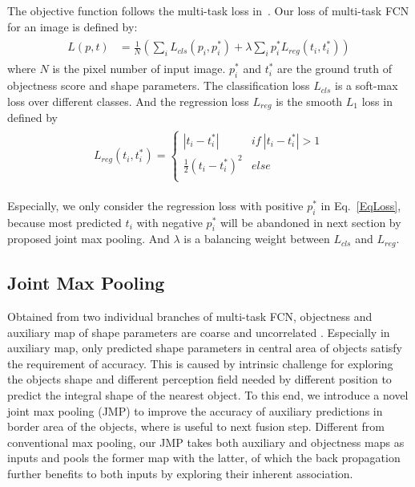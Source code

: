 The objective function follows the multi-task loss in~\cite{Ren2015}.
Our loss of multi-task FCN for an image is defined by:
\begin{eqnarray}\label{EqLoss}
\begin{aligned}
L(p,t) &= \frac{1}{N}(\sum_{i}L_{cls}(p_i,p^*_{i})+\lambda\sum_{i}p^*_{i}L_{reg}(t_{i},t^*_{i}))
\end{aligned}
\end{eqnarray}
where $N$ is the pixel number of input image.
$p^*_i$ and $t^*_i$ are the ground truth of objectness score and shape parameters.
The classification loss $L_{cls}$ is a soft-max loss over different classes.
And the regression loss $L_{reg}$ is the smooth $L_1$ loss in \cite{Ren2015} defined by
\begin{eqnarray}
\label{EqSmoothL1}
\begin{aligned}
L_{reg}(t_i,t^*_{i}) =\left\{\begin{array}{cc}
|t_i-t^*_{i}|&if~|t_{i}-t^*_{i}|>1\\
\frac{1}{2}(t_{i}-t^*_{i})^2&else\\
\end{array}\right.
\end{aligned}
\end{eqnarray}

Especially, we only consider the regression loss with positive $p^*_i$ in Eq.~\ref{EqLoss}, because most predicted $t_i$ with negative $p^*_i$ will be abandoned in next section by proposed joint max pooling.
And $\lambda$ is a balancing weight between $L_{cls}$ and $L_{reg}$.

\subsection{Joint Max Pooling}
\label{sec:joint-max-pooling}

Obtained from two individual branches of multi-task FCN, objectness and auxiliary map of shape parameters are coarse and uncorrelated .
Especially in auxiliary map, only predicted shape parameters in central area of objects satisfy the requirement of accuracy.
This is caused by intrinsic challenge for exploring the objects shape and different perception field needed by different position to predict the integral shape of the nearest object.
To this end, we introduce a novel joint max pooling (JMP) to improve the accuracy of auxiliary predictions in border area of the objects, where is useful to next fusion step.
Different from conventional max pooling, our JMP takes both auxiliary and objectness maps as inputs and pools the former map with the latter, of which the back propagation further benefits to both inputs by exploring their inherent association.

